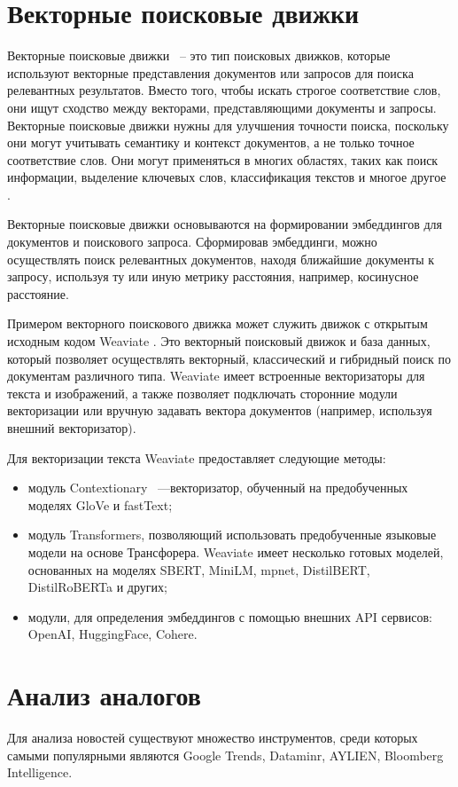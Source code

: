 \section{Векторные поисковые движки}
Векторные поисковые движки ~-- это тип поисковых движков, которые используют векторные представления документов или запросов для поиска релевантных результатов. Вместо того, чтобы искать строгое соответствие слов, они ищут сходство между векторами, представляющими документы и запросы. Векторные поисковые движки нужны для улучшения точности поиска, поскольку они могут учитывать семантику и контекст документов, а не только точное соответствие слов. Они могут применяться в многих областях, таких как поиск информации, выделение ключевых слов, классификация текстов и многое другое \cite{vector-search}.

Векторные поисковые движки основываются на формировании эмбеддингов для документов и поискового запроса. Сформировав эмбеддинги, можно осуществлять поиск релевантных документов, находя ближайшие документы к запросу, используя ту или иную метрику расстояния, например, косинусное расстояние.

Примером векторного поискового движка может служить движок с открытым исходным кодом Weaviate \cite{weaviate}. Это векторный поисковый движок и база данных, который позволяет осуществлять векторный, классический и гибридный поиск по документам различного типа. Weaviate имеет встроенные векторизаторы для текста и изображений, а также позволяет подключать сторонние модули векторизации или вручную задавать вектора документов (например, используя внешний векторизатор).

Для векторизации текста Weaviate предоставляет следующие методы:
\begin{itemize}
    \item модуль Contextionary ~---векторизатор, обученный на предобученных моделях GloVe и fastText;
    \item модуль Transformers, позволяющий использовать предобученные языковые модели на основе Трансфорера. Weaviate имеет несколько готовых моделей, основанных на моделях SBERT, MiniLM, mpnet, DistilBERT, DistilRoBERTa и других;
    \item модули, для определения эмбеддингов с помощью внешних API сервисов: OpenAI, HuggingFace, Cohere.
\end{itemize}

\section{Анализ аналогов}
Для анализа новостей существуют множество инструментов, среди которых самыми популярными являются Google Trends, Dataminr, AYLIEN, Bloomberg Intelligence.

